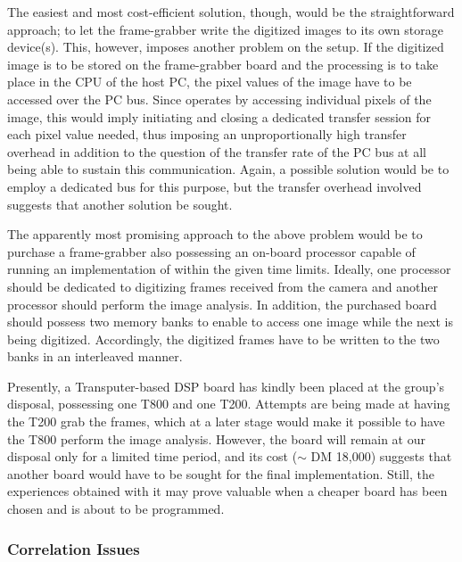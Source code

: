 The easiest and most cost-efficient solution, though, would be the
straightforward approach; to let the frame-grabber write the digitized
images to its own storage device(s).  This, however, imposes another
problem on the setup.  If the digitized image is to be stored on the
frame-grabber board and the processing is to take place in the CPU of
the host PC, the pixel values of the image have to be accessed over
the PC bus.  Since {\octopus} operates by accessing individual pixels
of the image, this would imply initiating and closing a dedicated
transfer session for each pixel value needed, thus imposing an
unproportionally high transfer overhead in addition to the question
of the transfer rate of the PC bus at all being able to sustain this
communication.  Again, a possible solution would be to employ a
dedicated bus for this purpose, but the transfer overhead involved
suggests that another solution be sought.

The apparently most promising approach to the above problem would be
to purchase a frame-grabber also possessing an on-board processor
capable of running an implementation of {\octopus} within the given
time limits.  Ideally, one processor should be dedicated to digitizing
frames received from the camera and another processor should perform
the image analysis.  In addition, the purchased board should possess
two memory banks to enable {\octopus} to access one image while the
next is being digitized.  Accordingly, the digitized frames have to be
written to the two banks in an interleaved manner.  

Presently, a Transputer-based DSP board has kindly been placed at the
group's disposal, possessing one T800 and one T200.  Attempts are
being made at having the T200 grab the frames, which at a later stage
would make it possible to have the T800 perform the image analysis.
However, the board will remain at our disposal only for a limited time
period, and its cost ($\sim$ DM 18,000) suggests that another board
would have to be sought for the final implementation.  Still, the
experiences obtained with it may prove valuable when a cheaper board
has been chosen and is about to be programmed.

\subsubsection{Correlation Issues}

